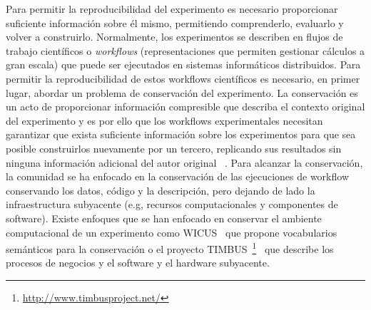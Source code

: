 Para permitir la reproducibilidad del experimento es necesario proporcionar suficiente información sobre él mismo, permitiendo comprenderlo, evaluarlo y volver a construirlo. 
Normalmente, los experimentos se describen en flujos de trabajo científicos o \emph{workflows} (representaciones que permiten gestionar cálculos a gran escala) que puede ser ejecutados en sistemas informáticos distribuidos.
Para permitir la reproducibilidad de estos workflows científicos es necesario, en primer lugar, abordar un problema de conservación del experimento.
La conservación es un acto de proporcionar información compresible que describa el contexto original del experimento y es por ello que los workflows experimentales necesitan garantizar que exista suficiente información sobre los experimentos para que sea posible construirlos nuevamente por un tercero, replicando sus resultados sin ninguna información adicional del autor original ~\cite{garijo2013quantifying}.
Para alcanzar la conservación, la comunidad se ha enfocado en la conservación de las ejecuciones de workflow conservando los datos, código y la descripción, pero dejando de lado la infraestructura subyacente (e.g, recursos computacionales y componentes de software).
Existe enfoques que se han enfocado en conservar el ambiente computacional de un experimento como WICUS~\cite{santana2017reproducibility} que propone vocabularios semánticos para la conservación o el proyecto TIMBUS~\footnote{\url{http://www.timbusproject.net/}}~\cite{dappert2013describing} que describe los procesos de negocios y el software y el hardware subyacente.

